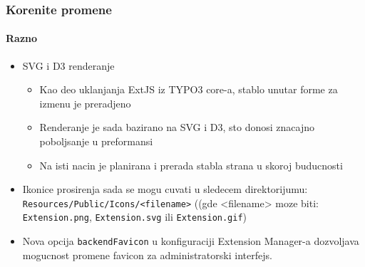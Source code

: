 \begin{frame}[fragile]
	\frametitle{Korenite promene}
	\framesubtitle{Razno}

	\begin{itemize}

		\item SVG i D3 renderanje

			\begin{itemize}
				\item Kao deo uklanjanja ExtJS iz TYPO3 core-a, stablo unutar forme za izmenu je preradjeno
				\item Renderanje je sada bazirano na SVG i D3, sto donosi znacajno poboljsanje u preformansi
				\item Na isti nacin je planirana i prerada stabla strana u skoroj buducnosti
			\end{itemize}

		\item Ikonice prosirenja sada se mogu cuvati u sledecem direktorijumu:\newline
			\small
				\texttt{Resources/Public/Icons/<filename>}
				((gde <filename> moze biti: \texttt{Extension.png}, \texttt{Extension.svg} ili \texttt{Extension.gif})
			\normalsize

		\item Nova opcija \texttt{backendFavicon} u konfiguraciji Extension Manager-a 
			dozvoljava mogucnost promene favicon za administratorski interfejs.

	\end{itemize}

\end{frame}

